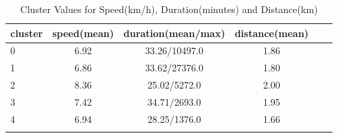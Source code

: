 \begin{longtable}{|l|c|c|c|c|c|}
    \hline
    \textbf{cluster} & \textbf{speed(mean)} & \textbf{duration(mean/max)} & \textbf{distance(mean)} \\
    \hline
    0                & 6.92                 & 33.26/10497.0               & 1.86                    \\
    \hline
    1                & 6.86                 & 33.62/27376.0               & 1.80                    \\
    \hline
    2                & 8.36                 & 25.02/5272.0                & 2.00                    \\
    \hline
    3                & 7.42                 & 34.71/2693.0                & 1.95                    \\
    \hline
    4                & 6.94                 & 28.25/1376.0                & 1.66                    \\
    \hline

    \caption{Cluster Values for Speed(km/h), Duration(minutes) and Distance(km)}
    \label{table:kmeans_trip_metrics}
\end{longtable}


